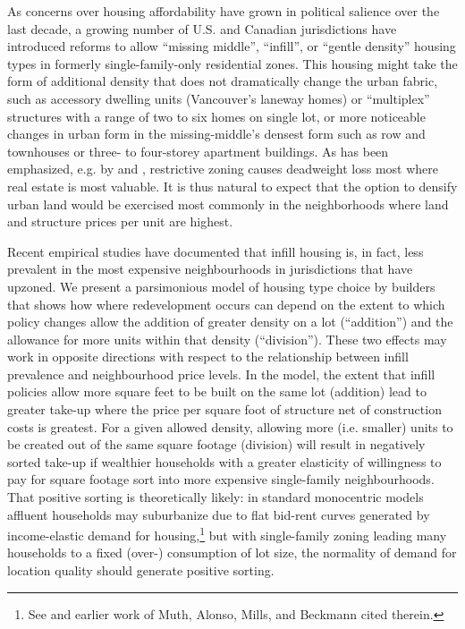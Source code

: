 \documentclass[12pt]{article}
\begin{document}
As concerns over housing affordability have grown in political salience over the last decade, a growing number of U.S. and Canadian jurisdictions have introduced reforms to allow ``missing middle'', ``infill'', or ``gentle density'' housing types in formerly single-family-only residential zones. This housing might take the form of additional density that does not dramatically change the urban fabric, such as accessory dwelling units (Vancouver's laneway homes) or ``multiplex'' structures with a range of two to six homes on single lot, or more noticeable changes in urban form in the missing-middle's densest form such as row and townhouses or three- to four-storey apartment buildings. As has been emphasized, e.g. by \textcite{bruecknerSingh} and \textcite{HsiehMoretti}, restrictive zoning causes deadweight loss most where real estate is most valuable. It is thus natural to expect that the option to densify urban land would be exercised most commonly in the neighborhoods where land and structure prices per unit are highest.

Recent empirical studies have documented that infill housing is, in fact, less prevalent in the most expensive neighbourhoods in jurisdictions that have upzoned. We present a parsimonious model of housing type choice by builders that shows how where redevelopment occurs can depend on the extent to which policy changes allow the addition of greater density on a lot (``addition'') and the allowance for more units within that density (``division''). These two effects may work in opposite directions with respect to the relationship between infill prevalence and neighbourhood price levels. In the model, the extent that infill policies allow more square feet to be built on the same lot (addition) lead to greater take-up where the price per square foot of structure net of construction costs is greatest. For a given allowed density, allowing more (i.e. smaller) units to be created out of the same square footage (division) will result in negatively sorted take-up if wealthier households with a greater elasticity of willingness to pay for square footage sort into more expensive single-family neighbourhoods. That positive sorting is theoretically likely: in standard monocentric models affluent households may suburbanize due to flat bid-rent curves generated by income-elastic demand for housing,\footnote{See \textcite{Wheaton77} and earlier work of Muth, Alonso, Mills, and Beckmann cited therein.} but with single-family zoning leading many households to a fixed (over-) consumption of lot size, the normality of demand for location quality should generate positive sorting.
\end{document}
